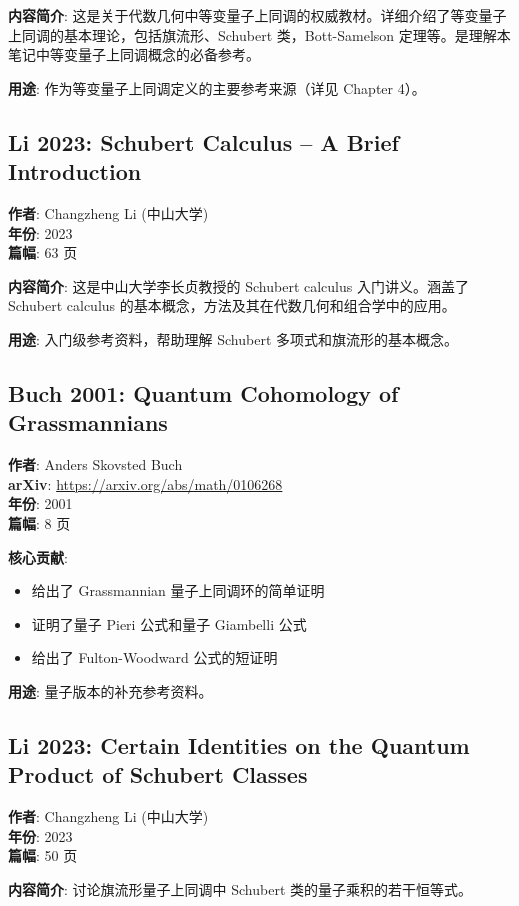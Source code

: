 \textbf{内容简介}: 这是关于代数几何中等变量子上同调的权威教材。详细介绍了等变量子上同调的基本理论，包括旗流形、Schubert 类，Bott-Samelson 定理等。是理解本笔记中等变量子上同调概念的必备参考。

\textbf{用途}: 作为等变量子上同调定义的主要参考来源（详见 Chapter 4）。

\subsection{Li 2023: Schubert Calculus -- A Brief Introduction}
\textbf{作者}: Changzheng Li (中山大学) \\
\textbf{年份}: 2023 \\
\textbf{篇幅}: 63 页

\textbf{内容简介}: 这是中山大学李长贞教授的 Schubert calculus 入门讲义。涵盖了 Schubert calculus 的基本概念，方法及其在代数几何和组合学中的应用。

\textbf{用途}: 入门级参考资料，帮助理解 Schubert 多项式和旗流形的基本概念。

\subsection{Buch 2001: Quantum Cohomology of Grassmannians}
\textbf{作者}: Anders Skovsted Buch \\
\textbf{arXiv}: \url{https://arxiv.org/abs/math/0106268} \\
\textbf{年份}: 2001 \\
\textbf{篇幅}: 8 页

\textbf{核心贡献}:
\begin{itemize}
\item 给出了 Grassmannian 量子上同调环的简单证明
\item 证明了量子 Pieri 公式和量子 Giambelli 公式
\item 给出了 Fulton-Woodward 公式的短证明
\end{itemize}

\textbf{用途}: 量子版本的补充参考资料。

\subsection{Li 2023: Certain Identities on the Quantum Product of Schubert Classes}
\textbf{作者}: Changzheng Li (中山大学) \\
\textbf{年份}: 2023 \\
\textbf{篇幅}: 50 页

\textbf{内容简介}: 讨论旗流形量子上同调中 Schubert 类的量子乘积的若干恒等式。

